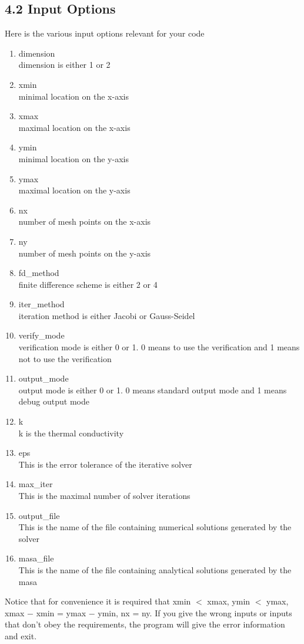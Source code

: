 \documentclass{article}
\begin{document}
\subsection*{4.2 Input Options}
Here is the various input options relevant for your code
\begin{enumerate}
	\item dimension\\
		dimension is either 1 or 2
	\item xmin\\
		minimal location on the x-axis
	\item xmax\\
		maximal location on the x-axis
	\item ymin\\
		minimal location on the y-axis
	\item ymax\\
		maximal location on the y-axis
	\item nx\\
		number of mesh points on the x-axis
	\item ny\\
		number of mesh points on the y-axis
	\item fd\_method\\
		finite difference scheme is either 2 or 4
	\item iter\_method\\
		iteration method is either Jacobi or Gauss-Seidel
	\item verify\_mode\\
		verification mode is either 0 or 1. 0 means to use the verification and 1 means not to use the verification
	\item output\_mode\\
		output mode is either 0 or 1. 0 means standard output mode and 1 means debug output mode
	\item k\\
		k is the thermal conductivity
	\item eps\\
		This is the error tolerance of the iterative solver
	\item max\_iter\\
		This is the maximal number of solver iterations
	\item output\_file\\
		This is the name of the file containing numerical solutions generated by the solver
	\item masa\_file\\
		This is the name of the file containing analytical solutions generated by the masa
\end{enumerate}
Notice that for convenience it is required that xmin $<$ xmax, ymin $<$ ymax, xmax $-$ xmin = ymax $-$ ymin, nx = ny. If you give the wrong inputs or inputs that don't obey the requirements, the program will give the error information and exit.
\end{document}
